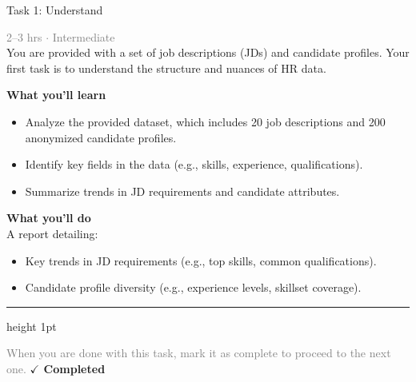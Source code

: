 \documentclass[10pt,a4paper]{article}
\begin{document}
\begin{taskbox}{Task 1: Understand}

    {\small \textcolor{gray}{2--3 hrs $\cdot$ Intermediate}}\\[12pt]

     You are provided with a set of job descriptions (JDs) and candidate profiles. Your first task is to understand the structure and nuances of HR data.  


\vspace{8pt}
{\large \textbf{\textcolor{brandLight}{What you'll learn}}}\\[4pt]  
\begin{itemize}
    \item Analyze the provided dataset, which includes 20 job descriptions and 200 anonymized candidate profiles.  
    \item Identify key fields in the data (e.g., skills, experience, qualifications).  
    \item Summarize trends in JD requirements and candidate attributes.  
\end{itemize}

\vspace{8pt}
{\large \textbf{\textcolor{brandLight}{What you'll do}}}\\[4pt]  
A report detailing:  
\begin{itemize}
    \item Key trends in JD requirements (e.g., top skills, common qualifications).  
    \item Candidate profile diversity (e.g., experience levels, skillset coverage).\par
\end{itemize}

    \vspace{16pt}

    \textcolor{cardBorder}{\hrule height 1pt}\vspace{8pt}

    \small \textcolor{gray}{When you are done with this task, mark it as complete to proceed to the next one.} \hfill \textbf{\textcolor{brandDark}{$\checkmark$ Completed}}

\end{taskbox}
\end{document}
